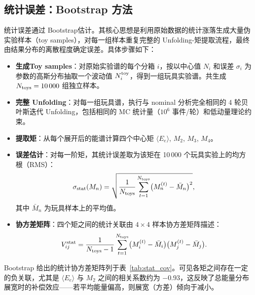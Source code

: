 \subsection{统计误差：Bootstrap 方法}\label{sec:bootstrap}
统计误差通过 Bootstrap估计。其核心思想是利用原始数据的统计涨落生成大量伪实验样本（toy samples），对每一组样本重复完整的 Unfolding-矩提取流程，最终由结果分布的离散程度确定误差。具体步骤如下：
\begin{itemize}
        \item \textbf{生成Toy samples}：对原始实验谱的每个分箱 $i$，按以中心值 $N_i$ 和误差 $\sigma_i$ 为参数的高斯分布抽取一个波动值 $N_i^{\rm toy}$，得到一组玩具实验谱。共生成 $N_{\rm toys} = 10\,000$ 组独立样本。
    \item \textbf{完整 Unfolding}：对每一组玩具谱，执行与 nominal 分析完全相同的 4 轮贝叶斯迭代 Unfolding，包括相同的 MC 统计量（$10^6$ 事件/轮）和低动量理论约束。
    \item \textbf{提取矩}：从每个展开后的能谱计算四个中心矩 $\langle E_e \rangle$, $M_2$, $M_3$, $M_4$。

    \item \textbf{误差估计}：对每一阶矩，其统计误差取为该矩在 10\,000 个玩具实验上的均方根（RMS）：
    \begin{equation}
        \sigma_{\rm stat}(M_n) = \sqrt{ \frac{1}{N_{\rm toys}} \sum_{t=1}^{N_{\rm toys}} \bigl(M_n^{(t)} - \bar{M}_n\bigr)^2 } ,
    \end{equation}
    其中 $\bar{M}_n$ 为玩具样本上的平均值。
    \item \textbf{协方差矩阵}：四个矩之间的统计关联由 $4\times4$ 样本协方差矩阵描述：
    \begin{equation}
        V_{ij}^{\rm stat} = \frac{1}{N_{\rm toys}-1} \sum_{t=1}^{N_{\rm toys}} \bigl(M_i^{(t)} - \bar{M}_i\bigr) \bigl(M_j^{(t)} - \bar{M}_j\bigr) .
    \end{equation}
\end{itemize}

Bootstrap 给出的统计协方差矩阵列于表~\ref{tab:stat_cov}。可见各矩之间存在一定的负关联，尤其是 $\langle E_e \rangle$ 与 $M_2$ 之间的相关系数约为 $-0.93$，这反映了总能量分布展宽时的补偿效应——若平均能量偏高，则展宽（方差）倾向于减小。


